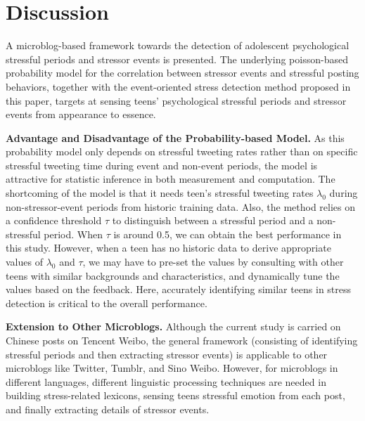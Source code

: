\section{Discussion}
A microblog-based framework towards the detection of
adolescent psychological stressful periods and stressor events is presented.
The underlying poisson-based probability model for the correlation between stressor events and
stressful posting behaviors,
together with the event-oriented stress detection method proposed in this paper,
targets at sensing teens' psychological stressful periods and stressor events
from appearance to essence.

\textbf{Advantage and Disadvantage of the Probability-based Model.}
As this probability model only depends on stressful tweeting rates rather than on
specific stressful tweeting time during event and non-event periods,
the model is attractive for statistic inference in both measurement and computation.
The shortcoming of the model is that
it needs teen's stressful tweeting rates $\lambda_0$
during non-stressor-event periods from historic training data.
Also, the method relies on a confidence threshold
$\tau$ to distinguish between a stressful period and a non-stressful period.
When $\tau$ is around 0.5, we can obtain the best performance in this study.
However, when a teen has no historic data to derive appropriate values of $\lambda_0$ and $\tau$,
we may have to pre-set the values by consulting with
other teens with similar backgrounds and characteristics,
and dynamically tune the values based on the feedback.
Here, accurately identifying similar teens in stress detection is critical to
the overall performance.


\textbf{Extension to Other Microblogs.} Although the current study is carried on Chinese posts on Tencent Weibo,
the general framework (consisting of identifying stressful periods and then
extracting stressor events) is applicable to other microblogs like Twitter, Tumblr, and Sino Weibo.
However, for microblogs in different languages,
different linguistic processing techniques are
needed in building stress-related lexicons,
sensing teens stressful emotion from each post, and finally
extracting details of stressor events.
